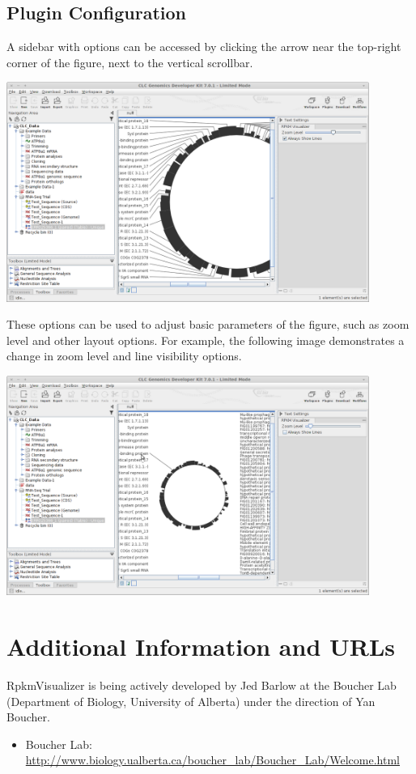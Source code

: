 \documentclass[12pt,letterpaper]{article}
\begin{document}
\subsection{Plugin Configuration}

A sidebar with options can be accessed by clicking the arrow near the top-right
corner of the figure, next to the vertical scrollbar.

\begin{center}
    \includegraphics[width=32em]{sidebar.png}
\end{center}

These options can be used to adjust basic parameters of the figure, such as
zoom level and other layout options.  For example, the following image
demonstrates a change in zoom level and line visibility options.

\begin{center}
    \includegraphics[width=32em]{sidebar-changed.png}
\end{center}

\section{Additional Information and URLs}

RpkmVisualizer is being actively developed by Jed Barlow at the Boucher Lab
(Department of Biology, University of Alberta) under the direction of Yan
Boucher.

\begin{itemize}
    \item
        Boucher Lab: \url{http://www.biology.ualberta.ca/boucher\_lab/Boucher\_Lab/Welcome.html}
\end{itemize}
\end{document}
